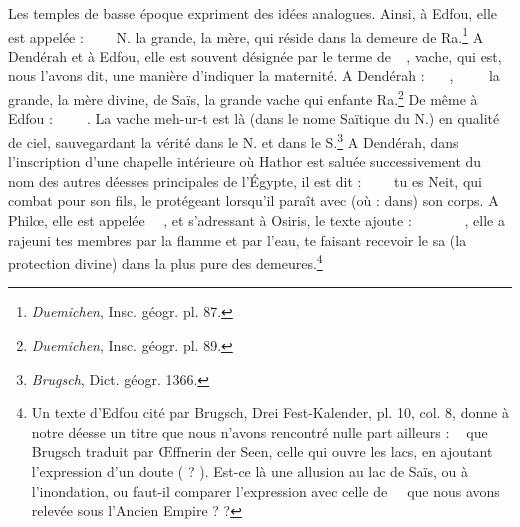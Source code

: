 \documentclass[a4paper, 11pt, oneside]{article}
\newcommand*\hieroAAAC{}
\newcommand*\hieroAAAD{}
\newcommand*\hieroAAAH{}
\newcommand*\hieroAAAW{\raisebox{0.5ex}{}}
\newcommand*\hieroAAAZ{}
\newcommand*\hieroAABB{}
\newcommand*\hieroAABC{\raisebox{0.5ex}{}}
\newcommand*\hieroAABE{}
\newcommand*\hieroAABR{}
\newcommand*\hieroAACB{\raisebox{0.5ex}{}}
\newcommand*\hieroAACS{}
\newcommand*\hieroAADR{}
\newcommand*\hieroAADV{\raisebox{0.5ex}{}}
\newcommand*\hieroAAEQ{}
\newcommand*\hieroAAHY{}
\newcommand*\hieroAAII{}
\newcommand*\hieroAAIM{}
\newcommand*\hieroAAKO{}
\newcommand*\hieroAALA{}
\newcommand*\hieroAALU{\raisebox{0.5ex}{}}
\newcommand*\hieroAAMZ{}
\newcommand*\hieroAANB{}
\newcommand*\hieroAANC{}
\newcommand*\hieroAANE{}
\newcommand*\hieroAASS{\raisebox{0.3ex}{}}
\newcommand*\hieroAATO{}
\newcommand*\hieroAAVX{\raisebox{0.5ex}{}}
\newcommand*\hieroAAXQ{\raisebox{0.5ex}{}}
\newcommand*\hieroAAXR{}
\newcommand*\hieroAAZI{}
\newcommand*\hieroAAZL{}
\newcommand*\hieroAAZM{}
\newcommand*\hieroAAZN{}
\newcommand*\hieroAAZO{\raisebox{0.5ex}{}}
\newcommand*\hieroAAZP{}
\newcommand*\hieroAAZQ{}
\newcommand*\hieroAAZR{}
\newcommand*\hieroAAZS{}
\newcommand*\hieroAAZT{}
\newcommand*\hieroAAZU{}
\newcommand*\hieroAAZV{}
\newcommand*\hieroAAZW{}
\newcommand*\hieroAAZX{\raisebox{0.3ex}{}}
\newcommand*\hieroAAZY{}
\newcommand*\hieroAAZZ{}
\newcommand*\hieroABAA{}
\newcommand*\hieroABAB{}
\newcommand*\hieroABAC{}
\newcommand*\hieroABAD{}
\newcommand*\hieroABAE{}
\newcommand*\hieroABAF{}
\newcommand*\hieroABAG{}
\newcommand*\hieroABAH{}
\newcommand*\hieroABAI{}
\newcommand*\hieroABAJ{}
\newcommand*\hieroABAK{}
\newcommand*\hieroABAL{}
\begin{document}
Les temples de basse époque expriment des idées analogues. Ainsi, à Edfou, elle est appelée : $\hieroAAAZ\:\hieroAAZL\:\hieroAAKO\allowbreak\:\hieroAAZM\:\hieroAADR\allowbreak\:\hieroAAXQ\:\hieroAAHY\:\hieroAAAC$ N. la grande, la mère, qui réside dans la demeure de Ra.\footnote{\emph{Duemichen}, Insc. géogr. pl. 87.} A Dendérah et à Edfou, elle est souvent désignée par le terme de $\hieroAAAH\:\hieroAALU\allowbreak\:\hieroAANB\:\hieroAAII$, vache, qui est, nous l'avons dit, une manière d'indiquer la maternité. A Dendérah : $\hieroAAAZ\:\hieroAAMZ\:\hieroAABB\allowbreak\:\hieroAANB\:\hieroAAAD\allowbreak\:\hieroAAEQ\:\hieroAAAW$, $\hieroAAAH\:\hieroAALU\:\hieroAAII\allowbreak\:\hieroAAZI\:\hieroAACB\:\hieroAANC\allowbreak\:\hieroAACS\:\hieroAAZN\:\hieroAAZO$ la grande, la mère divine, de Saïs, la grande vache qui enfante Ra.\footnote{\emph{Duemichen}, Insc. géogr. pl. 89.} De même à Edfou : $\hieroAANE\:\hieroAAZP\:\hieroAANB\allowbreak\:\hieroAAZQ\:\hieroAAZR\:\hieroAAZS\allowbreak\:\hieroAAZT\:\hieroAADV\allowbreak\:\hieroAAZU\:\hieroAABE$. La vache meh-ur-t est là (dans le nome Saïtique du N.) en qualité de ciel, sauvegardant la vérité dans le N. et dans le S.\footnote{\emph{Brugsch}, Dict. géogr. 1366.} A Dendérah, dans l'inscription d'une chapelle intérieure où Hathor est saluée successivement du nom des autres déesses principales de l'Égypte, il est dit : $\hieroAAZV\:\hieroAAZW\:\hieroAAZX\allowbreak\:\hieroAAZY\:\hieroAAZZ\:\hieroABAA\allowbreak\:\hieroAABR\:\hieroABAB$ tu es Neit, qui combat pour son fils, le protégeant lorsqu'il paraît avec (où : dans) son corps. A Philœ, elle est appelée $\hieroAAAZ\:\hieroAAXQ\:\hieroAAII\allowbreak\:\hieroAABC\:\hieroAAXR$, et s'adressant à Osiris, le texte ajoute : $\hieroABAC\:\hieroAAIM\:\hieroABAD\allowbreak\:\hieroABAE\:\hieroABAF\:\hieroABAG\:\hieroABAH\:\hieroAAVX\:\hieroABAI\allowbreak\:\hieroAATO\:\hieroAALA\:\hieroAADV\allowbreak\:\hieroABAJ\:\hieroAAHY\allowbreak\:\hieroAAHY\:\hieroAAHY$, elle a rajeuni tes membres par la flamme et par l'eau, te faisant recevoir le sa (la protection divine) dans la plus pure des demeures.\footnote{Un texte d'Edfou cité par Brugsch, Drei Fest-Kalender, pl. 10, col. 8, donne à notre déesse un titre que nous n'avons rencontré nulle part ailleurs : $\hieroAAAZ\:\hieroAASS\:\hieroABAK$ que Brugsch traduit par Œffnerin der Seen, celle qui ouvre les lacs, en ajoutant l'expression d'un doute ( ? ). Est-ce là une allusion au lac de Saïs, ou à l'inondation, ou faut-il comparer l'expression avec celle de $\hieroAASS\:\hieroABAL\allowbreak\:\hieroABAL\:\hieroABAL$ que nous avons relevée sous l'Ancien Empire ? ?}
\end{document}
